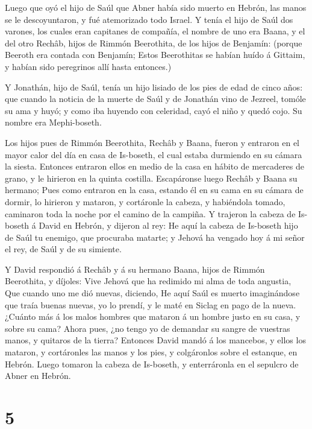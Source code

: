  Luego que oyó el hijo de Saúl que Abner había sido muerto
en Hebrón, las manos se le descoyuntaron, y fué atemorizado todo Israel.
 Y tenía el hijo de Saúl dos varones, los cuales eran
capitanes de compañía, el nombre de uno era Baana, y el del otro Rechâb,
hijos de Rimmón Beerothita, de los hijos de Benjamín: (porque Beeroth
era contada con Benjamín;  Estos Beerothitas se habían huído
á Gittaim, y habían sido peregrinos allí hasta entonces.)

 Y Jonathán, hijo de Saúl, tenía un hijo lisiado de los pies
de edad de cinco años: que cuando la noticia de la muerte de Saúl y de
Jonathán vino de Jezreel, tomóle su ama y huyó; y como iba huyendo con
celeridad, cayó el niño y quedó cojo. Su nombre era Mephi-boseth.

 Los hijos pues de Rimmón Beerothita, Rechâb y Baana, fueron
y entraron en el mayor calor del día en casa de Is-boseth, el cual
estaba durmiendo en su cámara la siesta.  Entonces entraron
ellos en medio de la casa en hábito de mercaderes de grano, y le
hirieron en la quinta costilla. Escapáronse luego Rechâb y Baana su
hermano;  Pues como entraron en la casa, estando él en su
cama en su cámara de dormir, lo hirieron y mataron, y cortáronle la
cabeza, y habiéndola tomado, caminaron toda la noche por el camino de la
campiña.  Y trajeron la cabeza de Is-boseth á David en
Hebrón, y dijeron al rey: He aquí la cabeza de Is-boseth hijo de Saúl tu
enemigo, que procuraba matarte; y Jehová ha vengado hoy á mi señor el
rey, de Saúl y de su simiente.

 Y David respondió á Rechâb y á su hermano Baana, hijos de
Rimmón Beerothita, y díjoles: Vive Jehová que ha redimido mi alma de
toda angustia,  Que cuando uno me dió nuevas, diciendo, He
aquí Saúl es muerto imaginándose que traía buenas nuevas, yo lo prendí,
y le maté en Siclag en pago de la nueva.  ¿Cuánto más á los
malos hombres que mataron á un hombre justo en su casa, y sobre su cama?
Ahora pues, ¿no tengo yo de demandar su sangre de vuestras manos, y
quitaros de la tierra?  Entonces David mandó á los
mancebos, y ellos los mataron, y cortáronles las manos y los pies, y
colgáronlos sobre el estanque, en Hebrón. Luego tomaron la cabeza de
Is-boseth, y enterráronla en el sepulcro de Abner en Hebrón.

\hypertarget{section-4}{%
\section{5}\label{section-4}}

